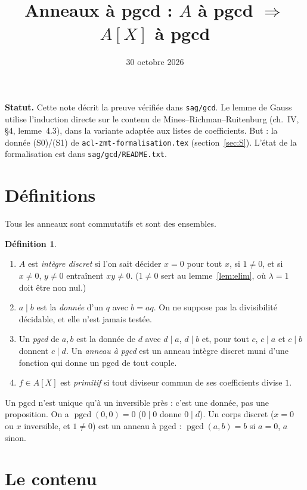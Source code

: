 \documentclass[11pt]{amsart}
\title{Anneaux à pgcd : $A$ à pgcd $\Rightarrow$ $A[X]$ à pgcd}
\date{30 octobre 2026}
\theoremstyle{definition}
\newtheorem{definition}[theorem]{Définition}
\theoremstyle{remark}
\newcommand{\pgcd}{\operatorname{pgcd}}
\begin{document}
\maketitle

\noindent\textbf{Statut.} Cette note décrit la preuve vérifiée dans
\texttt{sag/gcd}. Le lemme de Gauss utilise l'induction directe sur le
contenu de Mines--Richman--Ruitenburg (ch.~IV, \S4, lemme~4.3), dans
la variante adaptée aux listes de coefficients. But :
la donnée (S0)/(S1) de \texttt{acl-zmt-formalisation.tex}
(section~\ref{sec:S}). L'état de la formalisation est dans
\texttt{sag/gcd/README.txt}.

\section{Définitions}

Tous les anneaux sont commutatifs et sont des ensembles.

\begin{definition}
\begin{enumerate}
\item $A$ est \emph{intègre discret} si l'on sait décider $x=0$ pour
  tout $x$, si $1\ne0$, et si $x\ne0$, $y\ne0$ entraînent $xy\ne0$.
  ($1\ne0$ sert au lemme~\ref{lem:elim}, où $\lambda=1$ doit être non
  nul.)
\item $a\mid b$ est la \emph{donnée} d'un $q$ avec $b=aq$. On ne
  suppose pas la divisibilité décidable, et elle n'est jamais testée.
\item Un \emph{pgcd} de $a,b$ est la donnée de $d$ avec $d\mid a$,
  $d\mid b$ et, pour tout $c$, $c\mid a$ et $c\mid b$ donnent $c\mid d$.
  Un \emph{anneau à pgcd} est un anneau intègre discret muni d'une
  fonction qui donne un pgcd de tout couple.
\item $f\in A[X]$ est \emph{primitif} si tout diviseur commun de ses
  coefficients divise $1$.
\end{enumerate}
\end{definition}

Un pgcd n'est unique qu'à un inversible près : c'est une donnée, pas une
proposition. On a $\pgcd(0,0)=0$ ($0\mid0$ donne $0\mid d$). Un corps
discret ($x=0$ ou $x$ inversible, et $1\ne0$) est un anneau à pgcd :
$\pgcd(a,b)=b$ si $a=0$, $a$ sinon.

\section{Le contenu}
\end{document}
